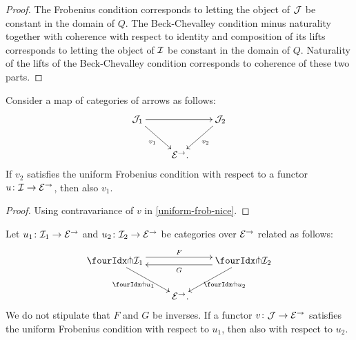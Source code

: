 \documentclass[reqno,10pt,a4paper,oneside,draft]{amsart}
\begin{document}

\begin{proof}
The Frobenius condition corresponds to letting the object of $\cal{J}$ be constant in the domain of $Q$.
The Beck-Chevalley condition minus naturality together with coherence with respect to identity and composition of its lifts corresponds to letting the object of $\cal{I}$ be constant in the domain of $Q$.
Naturality of the lifts of the Beck-Chevalley condition corresponds to coherence of these two parts.
\end{proof}

\begin{proposition} \label{uniform-frobenius-change-v}
Consider a map of categories of arrows as follows:
\[
\xymatrix{
  \cal{J}_1
  \ar[rr]
  \ar[dr]_{v_1}
&&
  \cal{J}_2
  \ar[dl]^{v_2}
\\&
  \catE^\to
\rlap{.}}
\]
If $v_2$ satisfies the uniform Frobenius condition with respect to a functor $u \co \cal{I} \to \catE^\to$, then also $v_1$.
\end{proposition}

\begin{proof}
Using contravariance of $v$ in \cref{uniform-frob-nice}.
\end{proof}

\begin{proposition} \label{uniform-frobenius-change-u}
Let $u_1 \co \cal{I}_1 \to \catE^\to$ and $u_2 \co \cal{I}_2 \to \catE^\to$ be categories over $\catE^\to$ related as follows:
\[
\xymatrix{
  \liftr{\cal{I}_1}
  \ar@<4pt>[rr]^{F}
  \ar[dr]_{\liftr{u_1}}
&&
  \liftr{\cal{I}_2}
  \ar@<4pt>[ll]^{G}
  \ar[dl]^{\liftr{u_2}}
\\&
  \catE^\to
\rlap{.}}
\]
We do not stipulate that $F$ and $G$ be inverses.
If a functor $v \co \cal{J} \to \catE^\to$ satisfies the uniform Frobenius condition with respect to $u_1$, then also with respect to $u_2$.
\end{proposition}
\end{document}
